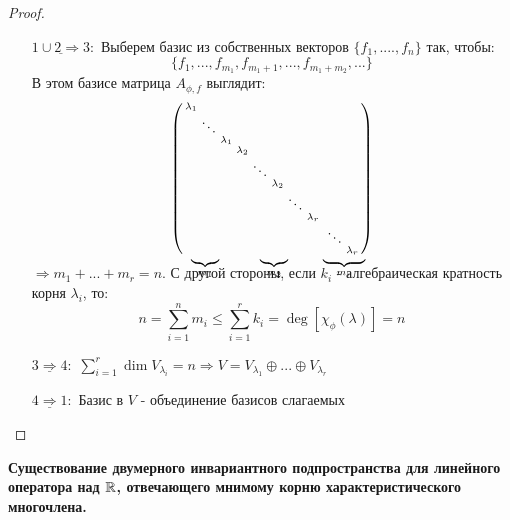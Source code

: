 \begin{proof}
\begin{itemize}
            \item[$\underline{1 \cup 2 \Rightarrow  3}:$] Выберем базис из собственных векторов $\{f_1,....,f_n\}$ так, чтобы: 
            $$\{f_1,...,f_{m_1},f_{m_1+1},...,f_{m_1+m_2},...\}$$
            В этом базисе матрица $A_{\phi, f}$ выглядит:
            \setcounter{MaxMatrixCols}{20}
            $$\left(\begin{smallmatrix}
                \lambda_1\\
                \null & \ddots \\
                \null & \null & \lambda_1 \\
                \null & \null & \null & \lambda_2 \\
                \null & \null & \null & \null & \ddots \\
                \null & \null & \null & \null & \null & \lambda_2 \\
                \null & \null & \null & \null & \null & \null & \ddots \\
                \null & \null & \null & \null & \null & \null & \null & \lambda_r \\
                \null & \null & \null & \null & \null & \null & \null & \null & \null & \ddots \\
                \undermat{m_1}{\null & \null & \null} & \null& \undermat{m_2}{\null & \null & \null} & \null & \undermat{m_r}{\null & \null & \lambda_r} \\
            \end{smallmatrix}\right) \vspace{0.7cm} $$ 
            $\Longrightarrow m_1+...+m_r = n$. С другой стороны, если $k_i$ - алгебраическая кратность корня $\lambda_i$, то:
            $$n = \sum \limits_{i=1}^nm_i \leq \sum \limits_{i=1}^rk_i = \deg [\chi_\phi(\lambda)] = n$$
            \item[$\underline{3 \Rightarrow 4}:$] $\sum \limits_{i=1}^r\dim V_{\lambda_i} = n \Longrightarrow V = V_{\lambda_1} \oplus ... \oplus V_{\lambda_r}$

            \item[$\underline{4 \Rightarrow  1}:$] Базис в $V$ - объединение базисов слагаемых 
        \end{itemize}
    \end{proof}
    
    

    \textbf{Существование двумерного инвариантного подпространства для линейного оператора над $\mathbb{R}$, отвечающего мнимому корню характеристического многочлена.}
    
